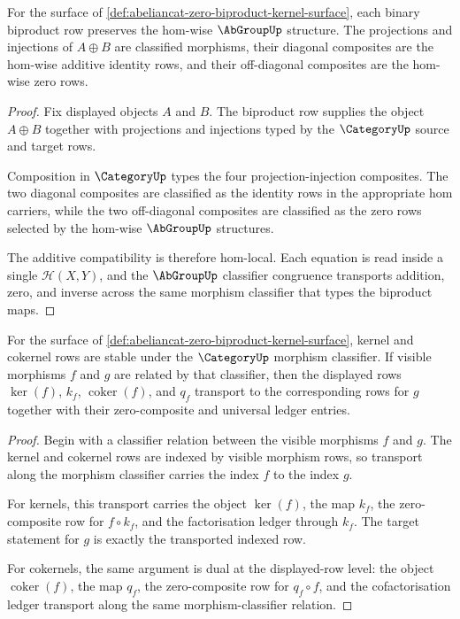 \begin{theorem}
\label{thm:abeliancat-biproduct-additive-hom-obligation}
For the surface of
\autoref{def:abeliancat-zero-biproduct-kernel-surface}, each binary
biproduct row preserves the hom-wise $\AbGroupUp$ structure. The projections
and injections of $A\oplus B$ are classified morphisms, their diagonal
composites are the hom-wise additive identity rows, and their off-diagonal
composites are the hom-wise zero rows.
\end{theorem}
\begin{proof}
Fix displayed objects $A$ and $B$. The biproduct row supplies the object
$A\oplus B$ together with projections and injections typed by the
$\CategoryUp$ source and target rows.

Composition in $\CategoryUp$ types the four projection-injection composites.
The two diagonal composites are classified as the identity rows in the
appropriate hom carriers, while the two off-diagonal composites are classified
as the zero rows selected by the hom-wise $\AbGroupUp$ structures.

The additive compatibility is therefore hom-local. Each equation is read
inside a single $\mathcal H(X,Y)$, and the $\AbGroupUp$ classifier congruence
transports addition, zero, and inverse across the same morphism classifier that
types the biproduct maps.
\end{proof}

\begin{theorem}
\label{thm:abeliancat-kernel-cokernel-obligation}
For the surface of
\autoref{def:abeliancat-zero-biproduct-kernel-surface}, kernel and cokernel
rows are stable under the $\CategoryUp$ morphism classifier. If visible
morphisms $f$ and $g$ are related by that classifier, then the displayed rows
$\ker(f)$, $k_f$, $\operatorname{coker}(f)$, and $q_f$ transport to the
corresponding rows for $g$ together with their zero-composite and universal
ledger entries.
\end{theorem}
\begin{proof}
Begin with a classifier relation between the visible morphisms $f$ and $g$.
The kernel and cokernel rows are indexed by visible morphism rows, so transport
along the morphism classifier carries the index $f$ to the index $g$.

For kernels, this transport carries the object $\ker(f)$, the map $k_f$, the
zero-composite row for $f\circ k_f$, and the factorisation ledger through
$k_f$. The target statement for $g$ is exactly the transported indexed row.

For cokernels, the same argument is dual at the displayed-row level: the object
$\operatorname{coker}(f)$, the map $q_f$, the zero-composite row for
$q_f\circ f$, and the cofactorisation ledger transport along the same
morphism-classifier relation.
\end{proof}

